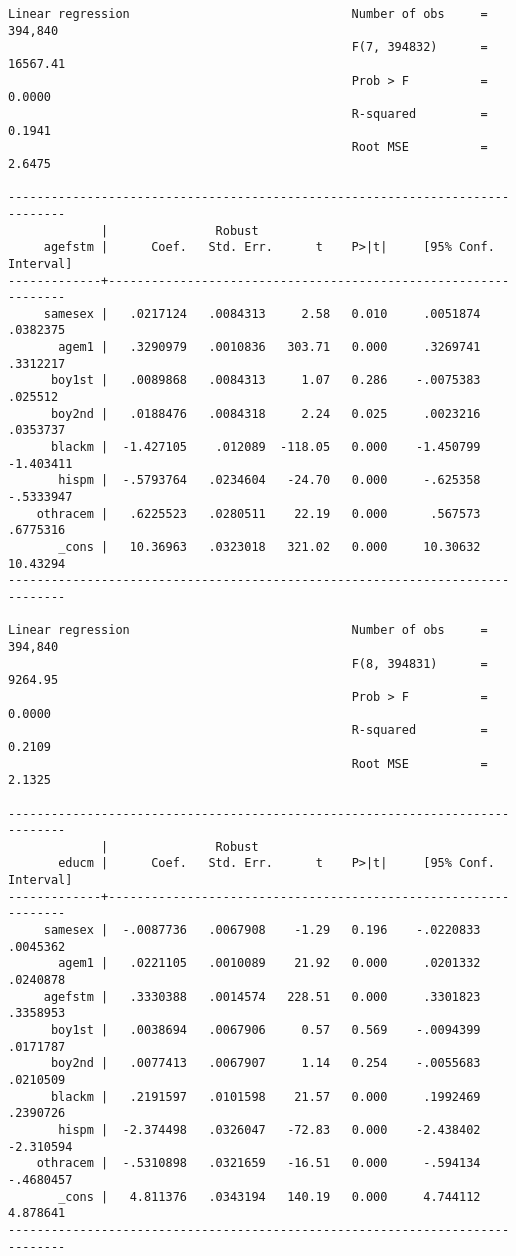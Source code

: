 \documentclass[11pt]{article}
\begin{document}
\begin{verbatim}
Linear regression                               Number of obs     =    394,840
                                                F(7, 394832)      =   16567.41
                                                Prob > F          =     0.0000
                                                R-squared         =     0.1941
                                                Root MSE          =     2.6475

------------------------------------------------------------------------------
             |               Robust
     agefstm |      Coef.   Std. Err.      t    P>|t|     [95% Conf. Interval]
-------------+----------------------------------------------------------------
     samesex |   .0217124   .0084313     2.58   0.010     .0051874    .0382375
       agem1 |   .3290979   .0010836   303.71   0.000     .3269741    .3312217
      boy1st |   .0089868   .0084313     1.07   0.286    -.0075383     .025512
      boy2nd |   .0188476   .0084318     2.24   0.025     .0023216    .0353737
      blackm |  -1.427105    .012089  -118.05   0.000    -1.450799   -1.403411
       hispm |  -.5793764   .0234604   -24.70   0.000     -.625358   -.5333947
    othracem |   .6225523   .0280511    22.19   0.000      .567573    .6775316
       _cons |   10.36963   .0323018   321.02   0.000     10.30632    10.43294
------------------------------------------------------------------------------

Linear regression                               Number of obs     =    394,840
                                                F(8, 394831)      =    9264.95
                                                Prob > F          =     0.0000
                                                R-squared         =     0.2109
                                                Root MSE          =     2.1325

------------------------------------------------------------------------------
             |               Robust
       educm |      Coef.   Std. Err.      t    P>|t|     [95% Conf. Interval]
-------------+----------------------------------------------------------------
     samesex |  -.0087736   .0067908    -1.29   0.196    -.0220833    .0045362
       agem1 |   .0221105   .0010089    21.92   0.000     .0201332    .0240878
     agefstm |   .3330388   .0014574   228.51   0.000     .3301823    .3358953
      boy1st |   .0038694   .0067906     0.57   0.569    -.0094399    .0171787
      boy2nd |   .0077413   .0067907     1.14   0.254    -.0055683    .0210509
      blackm |   .2191597   .0101598    21.57   0.000     .1992469    .2390726
       hispm |  -2.374498   .0326047   -72.83   0.000    -2.438402   -2.310594
    othracem |  -.5310898   .0321659   -16.51   0.000     -.594134   -.4680457
       _cons |   4.811376   .0343194   140.19   0.000     4.744112    4.878641
------------------------------------------------------------------------------
\end{verbatim}
\end{document}
